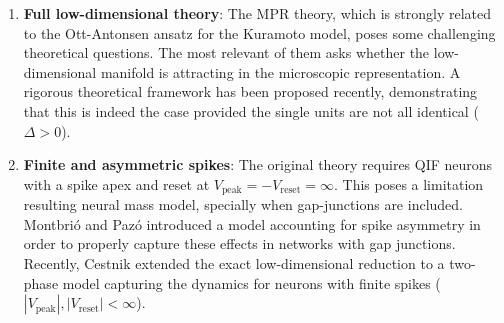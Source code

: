 \documentclass[12pt]{article}
\numberwithin{equation}{section}
\newcommand{\rev}[1]{\begingroup\color{navyblue}#1\endgroup}
\begin{document}
\begin{enumerate}
    \item \textbf{Full low-dimensional theory}: The MPR theory, which is strongly related to the Ott-Antonsen ansatz for the Kuramoto model\cite{Ott2008}, poses some challenging theoretical questions. The most relevant of them asks whether the low-dimensional manifold is attracting in the microscopic representation. A rigorous theoretical framework has been proposed recently, demonstrating that this is indeed the case provided the single units are not all identical ($\Delta>0$)\cite{Pietras2023}. 
    \rev{\item \textbf{Finite and asymmetric spikes}: The original theory requires QIF neurons with a 
    spike apex and reset at $V_\text{peak}=-V_\text{reset} = \infty$. This poses a limitation resulting neural mass model,
    specially when gap-junctions are included. Montbrió and Pazó \cite{montbrio2020} introduced a model accounting for spike asymmetry
     in order to properly capture these effects in networks with gap junctions. Recently, Cestnik \cite{cestnik2026} extended the exact low-dimensional reduction to a two-phase model capturing the dynamics for neurons with finite spikes ($|V_\text{peak}|,|V_\text{reset}| < \infty$).}
\end{enumerate}

\end{document}
